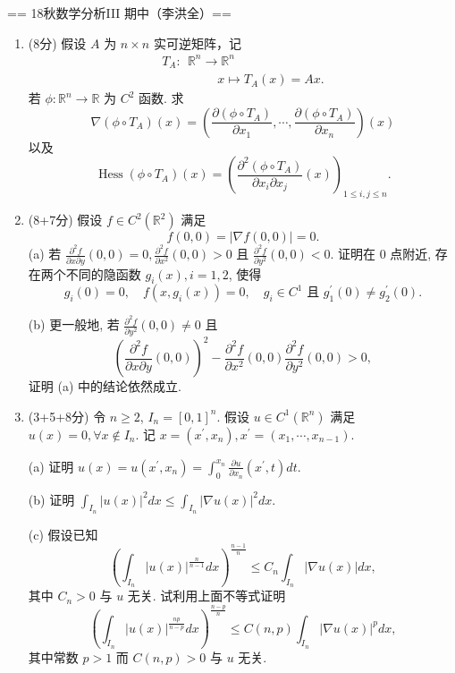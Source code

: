 == 18秋数学分析III 期中（李洪全）==
\begin{enumerate}
\item[一、] (8分) 假设 $A$ 为 $n \times n$ 实可逆矩阵，记
$$\begin{aligned}
T_A:\ \ \mathbb{R}^n \longrightarrow \mathbb{R}^n \qquad\qquad\\
\ \ \qquad\qquad x \mapsto T_A(x)=A x .
\end{aligned}$$
若 $\phi: \mathbb{R}^n \rightarrow \mathbb{R}$ 为 $C^2$ 函数. 求
$$\nabla(\phi \circ T_A)(x)=\left(\frac{\partial(\phi \circ T_A)}{\partial x_1}, \cdots, \frac{\partial(\phi \circ T_A)}{\partial x_n}\right)(x)$$
以及
$$\operatorname{Hess}(\phi \circ T_A)(x)
=\left(\frac{\partial^2(\phi \circ T_A)}{\partial x_i \partial x_j}(x)\right)_{1 \leq i, j \leq n}.$$

\item[二、] (8+7分) 假设 $f \in C^2(\mathbb{R}^2)$ 满足
$$f(0,0)=|\nabla f(0,0)|=0.$$
(a) 若 $\frac{\partial^2 f}{\partial x \partial y}(0,0)=0, 
\frac{\partial^2 f}{\partial x^2}(0,0)>0$ 
且 $\frac{\partial^2 f}{\partial y^2}(0,0)<0$. 
证明在 $0$ 点附近, 存在两个不同的隐函数 $g_i(x), i=1,2$, 使得
$$g_i(0)=0, \quad f(x, g_i(x))=0, \quad g_i \in C^1 \text { 且 } g_1^{\prime}(0) \neq g_2^{\prime}(0).$$

(b) 更一般地, 若 $\frac{\partial^2 f}{\partial y^2}(0,0) \neq 0$ 且
$$\left(\frac{\partial^2 f}{\partial x \partial y}(0,0)\right)^2
-\frac{\partial^2 f}{\partial x^2}(0,0) \frac{\partial^2 f}{\partial y^2}(0,0)>0,$$
证明 (a) 中的结论依然成立.

\item[三、] (3+5+8分) 令 $n \geq 2$, $I_n=[0,1]^n$. 
假设 $u \in C^1(\mathbb{R}^n)$ 满足 $u(x)=0, \forall x \notin I_n$. 
记 $x=(x^{\prime}, x_n), x^{\prime}=(x_1, \cdots, x_{n-1})$.

(a) 证明 $u(x)=u(x^{\prime}, x_n)=\int_0^{x_n} \frac{\partial u}{\partial x_n}(x^{\prime}, t) dt$.

(b) 证明 $\int_{I_n}|u(x)|^2 dx \leq \int_{I_n}|\nabla u(x)|^2 dx$.

(c) 假设已知
$$\left(\int_{I_n}|u(x)|^{\frac{n}{n-1}} dx\right)^{\frac{n-1}{n}} 
\leq C_n \int_{I_n}|\nabla u(x)| dx,$$
其中 $C_n>0$ 与 $u$ 无关. 试利用上面不等式证明
$$\left(\int_{I_n}|u(x)|^{\frac{np}{n-p}} dx\right)^{\frac{n-p}{n}} 
\leq C(n, p) \int_{I_n}|\nabla u(x)|^p dx,$$
其中常数 $p>1$ 而 $C(n, p)>0$ 与 $u$ 无关.


\end{enumerate}
